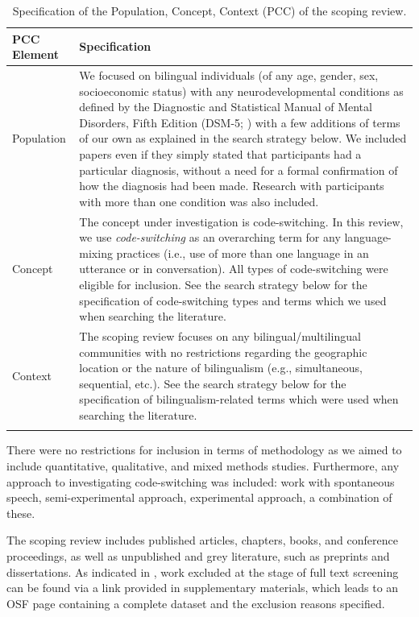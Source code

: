 \documentclass[output=paper]{langscibook}
\begin{document}
\begin{table}
\begin{tabularx}{\textwidth}{lQ}
\lsptoprule
PCC Element & Specification\\
\midrule
Population & { We focused on bilingual individuals (of any age, gender, sex, socioeconomic status) with any neurodevelopmental conditions as defined by the Diagnostic and Statistical Manual of Mental Disorders, Fifth Edition (DSM-5;  \citealt{AmericanPsychiatricAssociation2013}) with a few additions of terms of our own as explained in the search strategy below. We included papers even if they simply stated that participants had a particular diagnosis, without a need for a formal confirmation of how the diagnosis had been made. Research with participants with more than one condition was also included.} \\
Concept & { The concept under investigation is code-switching. In this review, we use \textit{code-switching} as an overarching term for any language-mixing practices (i.e., use of more than one language in an utterance or in conversation). All types of code-switching were eligible for inclusion. See the search strategy below for the specification of code-switching types and terms which we used when searching the literature.} \\
Context & { The scoping review focuses on any bilingual/multilingual communities with no restrictions regarding the geographic location or the nature of bilingualism (e.g., simultaneous, sequential, etc.).  See the search strategy below for the specification of bilingualism-related terms which were used when searching the literature.} \\
\lspbottomrule
\end{tabularx}
\caption{Specification of the Population, Concept, Context (PCC) of the scoping review.}
\label{tab:kascelan:1}
\end{table}

There were no restrictions for inclusion in terms of methodology as we aimed to include quantitative, qualitative, and mixed methods studies. Furthermore, any approach to investigating code-switching was included: work with spontaneous speech, semi-experimental approach, experimental approach, a combination of these.

The scoping review includes published articles, chapters, books, and conference proceedings, as well as unpublished and grey literature, such as preprints and dissertations. As indicated in \citet{KascelanParafitaCouto2022}, work excluded at the stage of full text screening can be found via a link provided in supplementary materials, which leads to an OSF page containing a complete dataset and the exclusion reasons specified.
\end{document}
